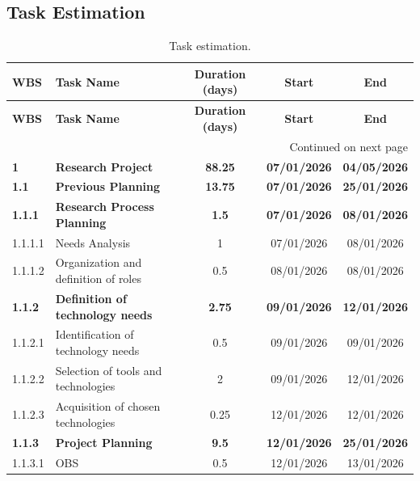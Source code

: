 \subsection{Task Estimation}
\begin{landscape}
\small
\setlength{\tabcolsep}{4pt}
\begin{longtable}{|l|l|c|c|c|}
    \caption{Task estimation.}
    \label{tab:task_estimation}\\
    \hline \textbf{WBS} & \textbf{Task Name} & \textbf{Duration (days)} & \textbf{Start} & \textbf{End} \\
    \hline
    \endfirsthead
    \hline \textbf{WBS} & \textbf{Task Name} & \textbf{Duration (days)} & \textbf{Start} & \textbf{End} \\
    \hline
    \endhead
    \hline
    \multicolumn{5}{|r|}{Continued on next page}\\ \hline
    \endfoot
    \hline
    \endlastfoot
        \textbf{1} & \textbf{Research Project} & \textbf{88.25} & \textbf{07/01/2026} & \textbf{04/05/2026} \\
        \hline
        \textbf{1.1} & \textbf{Previous Planning} & \textbf{13.75} & \textbf{07/01/2026} & \textbf{25/01/2026} \\
        \hline
        \textbf{1.1.1} & \textbf{Research Process Planning} & \textbf{1.5} & \textbf{07/01/2026} & \textbf{08/01/2026} \\
        \hline
        1.1.1.1 & Needs Analysis & 1 & 07/01/2026 & 08/01/2026 \\
        \hline
        1.1.1.2 & Organization and definition of roles & 0.5 & 08/01/2026 & 08/01/2026 \\
        \hline
        \textbf{1.1.2} & \textbf{Definition of technology needs} & \textbf{2.75} & \textbf{09/01/2026} & \textbf{12/01/2026} \\
        \hline
        1.1.2.1 & Identification of technology needs & 0.5 & 09/01/2026 & 09/01/2026 \\
        \hline
        1.1.2.2 & Selection of tools and technologies & 2 & 09/01/2026 & 12/01/2026 \\
        \hline
        1.1.2.3 & Acquisition of chosen technologies & 0.25 & 12/01/2026 & 12/01/2026 \\
        \hline
        \textbf{1.1.3} & \textbf{Project Planning} & \textbf{9.5} & \textbf{12/01/2026} & \textbf{25/01/2026} \\
        \hline
        1.1.3.1 & OBS & 0.5 & 12/01/2026 & 13/01/2026 \\

\end{longtable}
\end{landscape}
